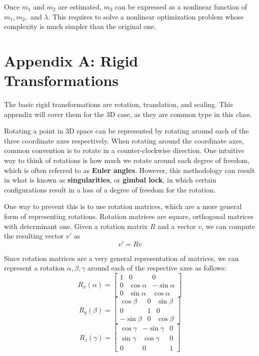 \documentclass[a4paper, 12pt]{article}
\renewcommand\emph{\textbf}
\begin{document}
Once $m_1$ and $m_2$ are estimated, $m_3$ can be expressed as a nonlinear function of $m_1,m_2,$ and $\lambda$. This requires to solve a nonlinear optimization problem whose complexity is much simpler than the original one.

\section{Appendix A: Rigid Transformations}
The basic rigid transformations are rotation, translation, and scaling. This appendix will cover them for the 3D case, as they are common type in this class. 

Rotating a point in 3D space can be represented by rotating around each of the three coordinate axes respectively. When rotating around the coordinate axes, common convention is to rotate in a counter-clockwise direction. One intuitive way to think of rotations is how much we rotate around each degree of freedom, which is often referred to as \emph{Euler angles}. However, this methodology can result in what is known as \emph{singularities}, or \emph{gimbal lock}, in which certain configurations result in a loss of a degree of freedom for the rotation. 

One way to prevent this is to use rotation matrices, which are a more general form of representing rotations. Rotation matrices are square, orthogonal matrices with determinant one. Given a rotation matrix $R$ and a vector $v$, we can compute the resulting vector $v'$ as
\[v' = Rv\]

Since rotation matrices are a very general representation of matrices, we can represent a rotation $\alpha, \beta, \gamma$ around each of the respective axes as follows:
\[R_x(\alpha) = \begin{bmatrix}1 & 0 & 0\\ 0 &\cos\alpha &-\sin\alpha \\ 0 &\sin\alpha &\cos\alpha \end{bmatrix}\]
\[R_y(\beta) = \begin{bmatrix}\cos\beta & 0 & \sin\beta \\ 0 & 1 & 0 \\ -\sin\beta & 0 &\cos\beta \end{bmatrix}\]
\[R_z(\gamma) = \begin{bmatrix}\cos \gamma & -\sin\gamma &0 \\ \sin\gamma &\cos\gamma & 0 \\ 0 & 0 & 1 \end{bmatrix}\]
\end{document}

